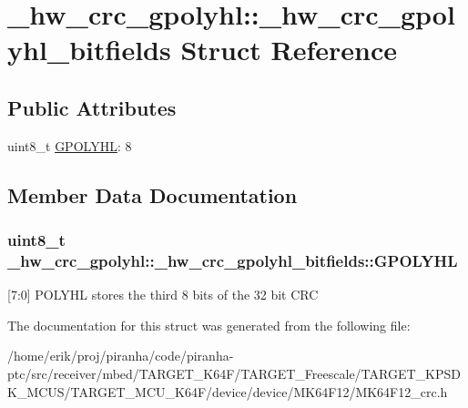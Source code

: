 \hypertarget{struct__hw__crc__gpolyhl_1_1__hw__crc__gpolyhl__bitfields}{}\section{\+\_\+hw\+\_\+crc\+\_\+gpolyhl\+:\+:\+\_\+hw\+\_\+crc\+\_\+gpolyhl\+\_\+bitfields Struct Reference}
\label{struct__hw__crc__gpolyhl_1_1__hw__crc__gpolyhl__bitfields}
\subsection*{Public Attributes}
\begin{DoxyCompactItemize}
\item 
uint8\+\_\+t \hyperlink{struct__hw__crc__gpolyhl_1_1__hw__crc__gpolyhl__bitfields_af69fe5779562256847e8d69bda925371}{G\+P\+O\+L\+Y\+HL}\+: 8
\end{DoxyCompactItemize}


\subsection{Member Data Documentation}
\subsubsection[{\texorpdfstring{G\+P\+O\+L\+Y\+HL}{GPOLYHL}}]{\setlength{\rightskip}{0pt plus 5cm}uint8\+\_\+t \+\_\+hw\+\_\+crc\+\_\+gpolyhl\+::\+\_\+hw\+\_\+crc\+\_\+gpolyhl\+\_\+bitfields\+::\+G\+P\+O\+L\+Y\+HL}\hypertarget{struct__hw__crc__gpolyhl_1_1__hw__crc__gpolyhl__bitfields_af69fe5779562256847e8d69bda925371}{}\label{struct__hw__crc__gpolyhl_1_1__hw__crc__gpolyhl__bitfields_af69fe5779562256847e8d69bda925371}
\mbox{[}7\+:0\mbox{]} P\+O\+L\+Y\+HL stores the third 8 bits of the 32 bit C\+RC 

The documentation for this struct was generated from the following file\+:\begin{DoxyCompactItemize}
\item 
/home/erik/proj/piranha/code/piranha-\/ptc/src/receiver/mbed/\+T\+A\+R\+G\+E\+T\+\_\+\+K64\+F/\+T\+A\+R\+G\+E\+T\+\_\+\+Freescale/\+T\+A\+R\+G\+E\+T\+\_\+\+K\+P\+S\+D\+K\+\_\+\+M\+C\+U\+S/\+T\+A\+R\+G\+E\+T\+\_\+\+M\+C\+U\+\_\+\+K64\+F/device/device/\+M\+K64\+F12/M\+K64\+F12\+\_\+crc.\+h\end{DoxyCompactItemize}
